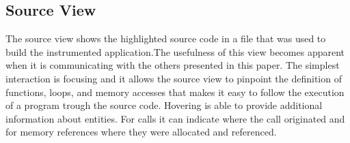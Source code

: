 \subsection{Source View}
The source view shows the highlighted source code in a file that was used to
build the instrumented application.The usefulness of this view becomes apparent
when it is communicating with the others presented in this paper. The simplest
interaction is focusing and it allows the source view to pinpoint the
definition of functions, loops, and memory accesses that makes it easy to
follow the execution of a program trough the source code. Hovering is able to
provide additional information about entities. For calls it can indicate where
the call originated and for memory references where they were allocated and
referenced.